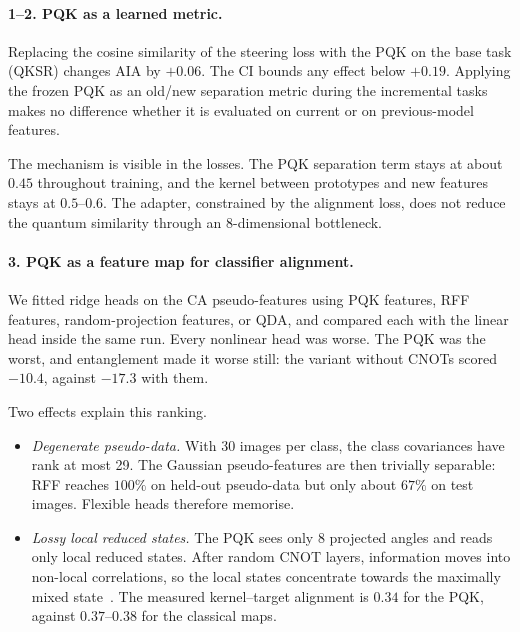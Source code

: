 \paragraph{1--2. PQK as a learned metric.}
Replacing the cosine similarity of the steering loss with the PQK on the
base task (QKSR) changes AIA by $+0.06$. The CI bounds any effect below
$+0.19$. Applying the frozen PQK as an old/new separation metric during the
incremental tasks makes no difference whether it is evaluated on current
or on previous-model features.

The mechanism is visible in the losses. The PQK separation term stays at
about $0.45$ throughout training, and the kernel between prototypes and
new features stays at $0.5$--$0.6$. The adapter, constrained by the
alignment loss, does not reduce the quantum similarity through an
8-dimensional bottleneck.

\paragraph{3. PQK as a feature map for classifier alignment.}
We fitted ridge heads on the CA pseudo-features using PQK features, RFF
features, random-projection features, or QDA, and compared each with the
linear head inside the same run. Every nonlinear head was worse. The PQK
was the worst, and entanglement made it worse still: the variant without
CNOTs scored $-10.4$, against $-17.3$ with them.

Two effects explain this ranking.
\begin{itemize}
  \item \emph{Degenerate pseudo-data.} With 30 images per class, the class
    covariances have rank at most 29. The Gaussian pseudo-features are then
    trivially separable: RFF reaches $100\%$ on held-out pseudo-data but only
    about $67\%$ on test images. Flexible heads therefore memorise.
  \item \emph{Lossy local reduced states.} The PQK sees only 8 projected
    angles and reads only local reduced states. After random CNOT layers,
    information moves into non-local correlations, so the local states
    concentrate towards the maximally mixed state~\cite{thanasilp2024concentration}.
    The measured kernel--target alignment is $0.34$ for the PQK, against
    $0.37$--$0.38$ for the classical maps.
\end{itemize}

